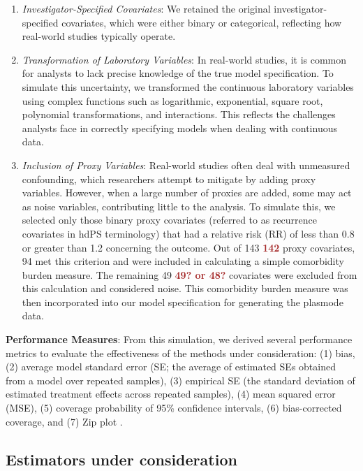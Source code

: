 \documentclass[sn-vancouver,Numbered,lineno,pdflatex]{sn-jnl}
\begin{document}
\begin{enumerate}
\def\labelenumi{\arabic{enumi}.}
\item
  \emph{Investigator-Specified Covariates}: We retained the original
  investigator-specified covariates, which were either binary or
  categorical, reflecting how real-world studies typically operate.
\item
  \emph{Transformation of Laboratory Variables}: In real-world studies,
  it is common for analysts to lack precise knowledge of the true model
  specification. To simulate this uncertainty, we transformed the
  continuous laboratory variables using complex functions such as
  logarithmic, exponential, square root, polynomial transformations, and
  interactions. This reflects the challenges analysts face in correctly
  specifying models when dealing with continuous data.
\item
  \emph{Inclusion of Proxy Variables}: Real-world studies often deal
  with unmeasured confounding, which researchers attempt to mitigate by
  adding proxy variables. However, when a large number of proxies are
  added, some may act as noise variables, contributing little to the
  analysis. To simulate this, we selected only those binary proxy
  covariates (referred to as recurrence covariates in hdPS terminology)
  that had a relative risk (RR) of less than 0.8 or greater than 1.2
  concerning the outcome. Out of 143 \textcolor{brown}{\textbf{142}}
  proxy covariates, 94 met this criterion and were included in
  calculating a simple comorbidity burden measure. The remaining 49
  \textcolor{brown}{\textbf{49? or 48?}} covariates were excluded from
  this calculation and considered noise. This comorbidity burden measure
  was then incorporated into our model specification for generating the
  plasmode data.
\end{enumerate}

\textbf{Performance Measures}: From this simulation, we derived several
performance metrics to evaluate the effectiveness of the methods under
consideration: (1) bias, (2) average model standard error (SE; the
average of estimated SEs obtained from a model over repeated samples),
(3) empirical SE (the standard deviation of estimated treatment effects
across repeated samples), (4) mean squared error (MSE), (5) coverage
probability of 95\% confidence intervals, (6) bias-corrected coverage,
and (7) Zip plot \citep{morris2019using, white2023check}.

\subsection*{Estimators under
consideration}\label{estimators-under-consideration}
\end{document}
